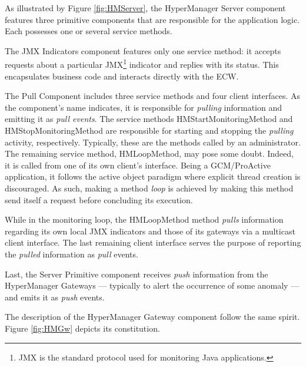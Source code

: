 		
	As illustrated by Figure \ref{fig:HMServer}, the \textsf{HyperManager Server} component 
	features three primitive components that are responsible for	 the application logic. Each possesses  
	one or several service methods.
	
	The \textsf{JMX Indicators} component
	features only one service method: it accepts requests about a particular \ac{JMX}\footnote{\ac{JMX} is the standard protocol used for monitoring Java applications.}
	indicator and replies with its status. 
	This encapsulates business code and interacts directly with the \ac{ECW}.
	
	The \textsf{Pull Component} includes three service methods and four client interfaces. As the component's name indicates, it
	is responsible for \textit{pulling} information and emitting it as \textit{pull events}. The service methods \textsf{HMStartMonitoringMethod}
	and \textsf{HMStopMonitoringMethod} are responsible for starting and stopping the \textit{pulling} activity, respectively. Typically, these are the 
	methods called by an administrator. The remaining service method, \textsf{HMLoopMethod}, may pose some doubt. Indeed, it is called from
	one of its own client's interface. Being a \ac{GCM}/ProActive application, it follows the active object paradigm where explicit thread creation is discouraged.
 	As such, making a method \textit{loop} is achieved by making this method send itself a request before concluding its execution.	
 	
 	While in the monitoring loop, the \textsf{HMLoopMethod} method \textit{pulls} information regarding its own local \ac{JMX} indicators and those of its gateways 
 	via a multicast client interface. The last remaining client interface serves the purpose of reporting the \textit{pulled} information as \textit{pull} events.
		
	Last, the \textsf{Server Primitive} component receives \textit{push} information from the \textsf{HyperManager Gateway}s 
	--- typically to alert the occurrence of some anomaly --- and
	emits it as \textit{push} events. %
		
	The description of the \textsf{HyperManager Gateway} component follow the same spirit. Figure	 \ref{fig:HMGw} depicts its constitution.
	
